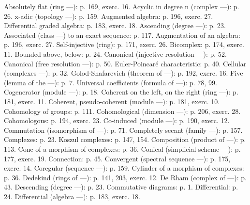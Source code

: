 
Absolutely flat (ring ---): p. 169, exerc. 16. Acyclic in degree n (complex ---): p. 26. x-adic (topology ---): p. 159. Augmented algebra: p. 196, exerc. 27. Differential graded algebra: p. 183, exerc. 18. Ascending (degree ---): p. 23. Associated (class ---) to an exact sequence: p. 117. Augmentation of an algebra: p. 196, exerc. 27. Self-injective (ring): p. 171, exerc. 26. Bicomplex: p. 174, exerc. 11. Bounded above, below: p. 24. Canonical (injective resolution ---): p. 52. Canonical (free resolution ---): p. 50. Euler-Poincaré characteristic: p. 40. Cellular (complexes ---): p. 32. Golod-Shafarevich (theorem of ---): p. 192, exerc. 16. Five (lemma of the ---): p. 7. Universal coefficients (formula of ---): p. 78, 99. Cogenerator (module ---): p. 18. Coherent on the left, on the right (ring ---): p. 181, exerc. 11. Coherent, pseudo-coherent (module ---): p. 181, exerc. 10. Cohomology of groups: p. 111. Cohomological (dimension ---): p. 206, exerc. 28. Cohomologous: p. 194, exerc. 23. Co-induced (module ---): p. 190, exerc. 12. Commutation (isomorphism of ---): p. 71. Completely secant (family ---): p. 157. Complexes: p. 23. Koszul complexes: p. 147, 154. Composition (product of ---): p. 113. Cone of a morphism of complexes: p. 36. Conical (simplicial scheme ---): p. 177, exerc. 19. Connection: p. 45. Convergent (spectral sequence ---): p. 175, exerc. 14. Coregular (sequence ---): p. 159. Cylinder of a morphism of complexes: p. 36. Dedekind (rings of ---): p. 141, 203, exerc. 12. De Rham (complex of ---): p. 43. Descending (degree ---): p. 23. Commutative diagrams: p. 1. Differential: p. 24. Differential (algebra ---): p. 183, exerc. 18.

